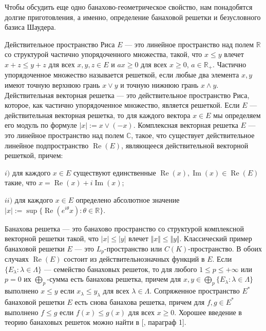 Чтобы обсудить еще одно банахово-геометрическое свойство, нам понадобятся долгие приготовления, а именно, определение банаховой решетки и безусловного базиса Шаудера. 

Действительное пространство Риса $E$ --- это линейное пространство над полем $\mathbb{R}$ со структурой частично упорядоченного множества, такой, что  $x\leq y$ влечет $x+z\leq y+z$ для всех $x,y,z\in E$ и $ax\geq 0$ для всех $x\geq 0$, $a\in\mathbb{R}_+$. Частично упорядоченное множество называется решеткой, если любые два элемента ${x,y}$ имеют точную верхнюю грань $x\vee y$ и точную нижнюю грань $x\wedge y$. Действительная векторная решетка --- это действительное пространство Риса, которое, как частично упорядоченное множество, является решеткой. Если $E$ --- действительная векторная решетка, то для каждого вектора $x\in E$ мы определяем его модуль по формуле $|x|:=x\vee(-x)$. Комплексная векторная решетка $E$ --- это линейное пространство над полем $\mathbb{C}$, такое, что существует действительное линейное подпространство $\operatorname{Re}(E)$, являющееся действительной векторной решеткой, причем:

$i)$ для каждого $x\in E$ существуют единственные $\operatorname{Re}(x),\operatorname{Im}(x)\in \operatorname{Re}(E)$ такие, что $x=\operatorname{Re}(x)+i\operatorname{Im}(x)$;

$ii)$ для каждого $x\in E$ определено абсолютное значение $|x|:=\sup\{\operatorname{Re}(e^{i\theta}x):\theta\in\mathbb{R}\}$.

Банахова решетка --- это банахово пространство со структурой комплексной векторной решетки такой, что $|x|\leq |y|$ влечет $\Vert x\Vert\leq \Vert y\Vert$. Классический пример банаховой решетки $E$ --- это $L_p$-пространство или $C(K)$-пространство. В обоих случаях $\operatorname{Re}(E)$ состоит из действительнозначных функций в $E$. Если $\{E_\lambda:\lambda\in\Lambda\}$ --- семейство банаховых решеток, то для любого $1\leq p\leq +\infty$ или $p=0$ их $\bigoplus_p$-сумма есть банахова решетка, причем для $x,y\in\bigoplus_p\{ E_\lambda:\lambda\in\Lambda\}$ выполнено $x\leq y$ если $x_\lambda\leq y_\lambda$ для всех $\lambda\in\Lambda$. Сопряженное пространство $E^*$  банаховой решетки $E$ есть снова банахова решетка, причем для $f,g\in  E^*$ выполнено $f\leq g$ если $f(x)\leq g(x)$ для всех $x\geq 0$. Хорошее введение в теорию банаховых решеток можно найти в [\cite{LaceyIsomThOfClassicBanSp}, параграф 1].

